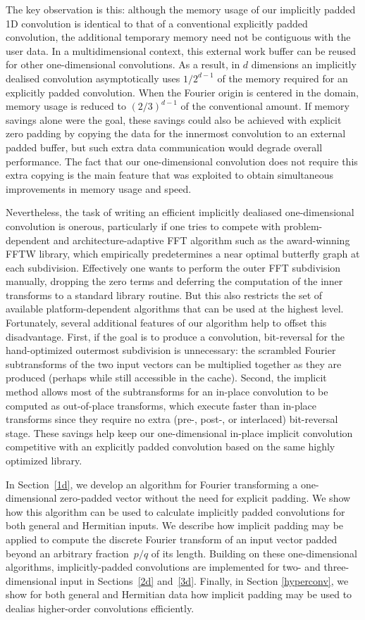 \documentclass[final]{siamltex}
\begin{document}
The key observation is this: although the memory usage of our implicitly
padded 1D convolution is identical to that of a conventional explicitly
padded convolution, the additional temporary memory need not be contiguous
with the user data.  In a multidimensional context, this external work
buffer can be reused for other one-dimensional convolutions.
As a result, in $d$ dimensions an implicitly dealised convolution
asymptotically uses $1/2^{d-1}$ of the
memory required for an explicitly padded convolution. When the Fourier origin is
centered in the domain, memory usage is reduced to $(2/3)^{d-1}$ of the
conventional amount.
If memory savings alone were the goal, these savings could
also be achieved with explicit zero padding by copying the data for the
innermost convolution to an external padded buffer, but such extra data
communication would degrade overall performance. The fact that our
one-dimensional convolution does not require this extra copying is the
main feature that was exploited to obtain simultaneous improvements in
memory usage and speed.

Nevertheless, the task of writing an efficient implicitly dealiased
one-dimensional convolution is onerous, particularly if one tries to
compete with problem-dependent and architecture-adaptive
FFT algorithm such as the award-winning FFTW \cite{Frigo05} library, which
empirically predetermines a near optimal butterfly graph
at each subdivision. Effectively one wants to perform
the outer FFT subdivision manually, dropping the zero terms and
deferring the computation of the inner transforms to a standard library
routine. But this also restricts the set of available platform-dependent
algorithms that can be used at the highest level. Fortunately, several 
additional features of our algorithm help to offset this disadvantage. First, if
the goal is to  produce a convolution, bit-reversal for the hand-optimized
outermost subdivision is unnecessary: the scrambled Fourier subtransforms of the
two input vectors can be multiplied together as they are produced
(perhaps while still accessible in the cache). Second, the implicit
method allows most of the subtransforms for an in-place convolution to
be computed as out-of-place transforms, which execute faster than
in-place transforms since they require no extra (pre-, post-, or
interlaced) bit-reversal stage.  These savings help keep our
one-dimensional in-place implicit convolution competitive with an
explicitly padded convolution based on the same highly optimized
library.

In Section~\ref{1d}, we develop an algorithm for Fourier transforming a
one-dimensional zero-padded vector without the need for explicit
padding. We show how this algorithm can be used to calculate implicitly
padded convolutions for both general and Hermitian inputs. 
We describe how implicit padding may be
applied to compute the discrete Fourier transform of an input
vector padded beyond an arbitrary fraction~$p/q$ of its length. 
Building on these one-dimensional algorithms, implicitly-padded
convolutions are implemented for two- and three-dimensional input 
in Sections~\ref{2d} and~\ref{3d}. Finally, in Section \ref{hyperconv}, we
show for both general and Hermitian data how implicit padding may be used to
dealias higher-order convolutions efficiently.
\end{document}
